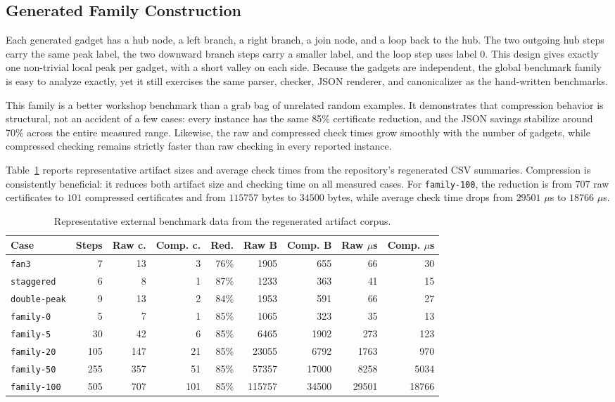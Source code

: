 \documentclass[submission,copyright,creativecommons]{eptcs}
\newcommand{\family}[1]{\texttt{family-#1}}
\begin{document}
\subsection{Generated Family Construction}

Each generated gadget has a hub node, a left branch, a right branch, a join
node, and a loop back to the hub. The two outgoing hub steps carry the same peak
label, the two downward branch steps carry a smaller label, and the loop step
uses label $0$. This design gives exactly one non-trivial local peak per gadget,
with a short valley on each side. Because the gadgets are independent, the
global benchmark family is easy to analyze exactly, yet it still exercises the
same parser, checker, JSON renderer, and canonicalizer as the hand-written
benchmarks.

This family is a better workshop benchmark than a grab bag of unrelated random
examples. It demonstrates that compression behavior is structural, not an
accident of a few cases: every instance has the same 85\% certificate reduction,
and the JSON savings stabilize around 70\% across the entire measured range.
Likewise, the raw and compressed check times grow smoothly with the number of
gadgets, while compressed checking remains strictly faster than raw checking in
every reported instance.

Table~\ref{tab:benchmarks} reports representative artifact sizes and average
check times from the repository's regenerated CSV summaries. Compression is
consistently beneficial: it reduces both artifact size and checking time on all
measured cases. For \family{100}, the reduction is from $707$ raw certificates
to $101$ compressed certificates and from $115757$ bytes to $34500$ bytes,
while average check time drops from $29501$ $\mu$s to $18766$ $\mu$s.

\begin{table}[t]
\centering
\small
\begin{tabular}{lrrrrrrrr}
\toprule
Case & Steps & Raw c. & Comp. c. & Red. & Raw B & Comp. B & Raw $\mu$s & Comp. $\mu$s \\
\midrule
\texttt{fan3} & 7 & 13 & 3 & 76\% & 1905 & 655 & 66 & 30 \\
\texttt{staggered} & 6 & 8 & 1 & 87\% & 1233 & 363 & 41 & 15 \\
\texttt{double-peak} & 9 & 13 & 2 & 84\% & 1953 & 591 & 66 & 27 \\
\family{0} & 5 & 7 & 1 & 85\% & 1065 & 323 & 35 & 13 \\
\family{5} & 30 & 42 & 6 & 85\% & 6465 & 1902 & 273 & 123 \\
\family{20} & 105 & 147 & 21 & 85\% & 23055 & 6792 & 1763 & 970 \\
\family{50} & 255 & 357 & 51 & 85\% & 57357 & 17000 & 8258 & 5034 \\
\family{100} & 505 & 707 & 101 & 85\% & 115757 & 34500 & 29501 & 18766 \\
\bottomrule
\end{tabular}
\caption{Representative external benchmark data from the regenerated artifact corpus.}
\label{tab:benchmarks}
\end{table}
\end{document}
